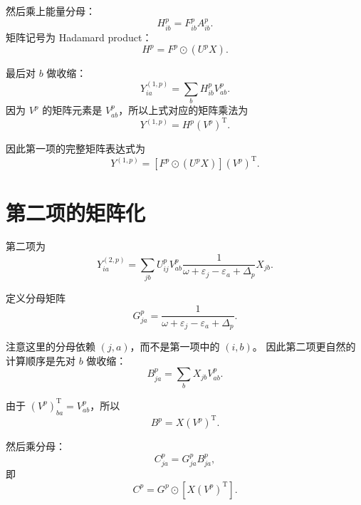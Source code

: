 \documentclass[UTF8,a4paper,11pt]{ctexart}
\newcommand{\eps}{\varepsilon}
\newcommand{\Had}{\odot}
\newcommand{\trans}{\mathrm{T}}
\begin{document}
然后乘上能量分母：
\begin{equation}
H^p_{ib}
=
F^p_{ib}A^p_{ib}.
\label{eq:H_def}
\end{equation}
矩阵记号为 Hadamard product：
\begin{equation}
H^p
=
F^p \Had (U^p X).
\label{eq:H_mat}
\end{equation}

最后对 $b$ 做收缩：
\begin{equation}
Y^{(1,p)}_{ia}
=
\sum_b H^p_{ib}V^p_{ab}.
\label{eq:Y1_contract}
\end{equation}
因为 $V^p$ 的矩阵元素是 $V^p_{ab}$，所以上式对应的矩阵乘法为
\begin{equation}
Y^{(1,p)}
=
H^p (V^p)^{\trans}.
\label{eq:Y1_mat}
\end{equation}

因此第一项的完整矩阵表达式为
\begin{equation}
\boxed{
Y^{(1,p)}
=
\left[
F^p\Had (U^pX)
\right]
(V^p)^{\trans}
}.
\label{eq:Y1_final}
\end{equation}

\section{第二项的矩阵化}

第二项为
\begin{equation}
Y^{(2,p)}_{ia}
=
\sum_{jb}
U^p_{ij}V^p_{ab}
\frac{1}{\omega+\eps_j-\eps_a+\Delta_p}
X_{jb}.
\label{eq:second_term}
\end{equation}

定义分母矩阵
\begin{equation}
G^p_{ja}
=
\frac{1}{\omega+\eps_j-\eps_a+\Delta_p}.
\label{eq:G_def}
\end{equation}

注意这里的分母依赖 $(j,a)$，而不是第一项中的 $(i,b)$。
因此第二项更自然的计算顺序是先对 $b$ 做收缩：
\begin{equation}
B^p_{ja}
=
\sum_b X_{jb}V^p_{ab}.
\label{eq:B_def}
\end{equation}

由于 $(V^p)^{\trans}_{ba}=V^p_{ab}$，所以
\begin{equation}
B^p
=
X(V^p)^{\trans}.
\label{eq:B_mat}
\end{equation}

然后乘分母：
\begin{equation}
C^p_{ja}
=
G^p_{ja}B^p_{ja},
\end{equation}
即
\begin{equation}
C^p
=
G^p\Had \left[X(V^p)^{\trans}\right].
\label{eq:C_mat}
\end{equation}
\end{document}
